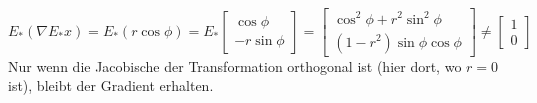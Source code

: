 \documentclass[12pt]{article}
\begin{document}
$$
E_*\left(\nabla E_* x\right) = E_*\left(r\cos\phi\right) = E_*\left[\begin{array}{c} \cos\phi\\-r\sin\phi\end{array}\right]= \left[\begin{array}{c} 
\cos^2\phi +r^2\sin^2\phi\\
(1-r^2) \sin\phi\cos\phi
\end{array}\right] 
\neq \left[\begin{array}{c}1\\0\end{array}\right]
$$
Nur wenn die Jacobische der Transformation orthogonal ist (hier dort, wo $r=0$ ist), bleibt der Gradient erhalten.
\end{document}
